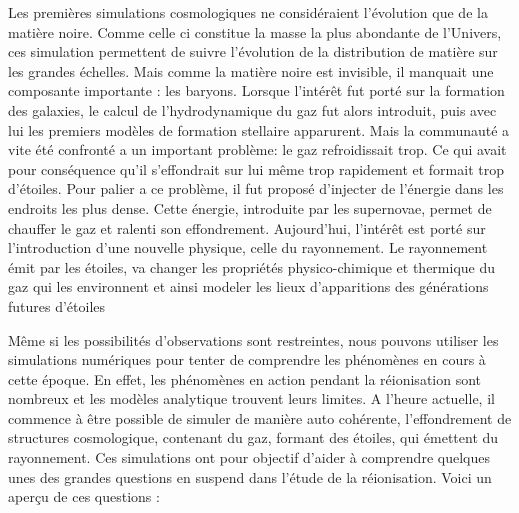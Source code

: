 Les premières simulations cosmologiques ne considéraient l'évolution que de la matière noire. %
Comme celle ci constitue la masse la plus abondante de l'Univers, ces simulation permettent de suivre l'évolution de la distribution de matière sur les grandes échelles. 
Mais comme la matière noire est invisible, il manquait une composante importante : les baryons.
Lorsque l'intérêt fut porté sur la formation des galaxies, le calcul de l'hydrodynamique du gaz fut alors introduit, puis avec lui les premiers modèles de formation stellaire apparurent.
Mais la communauté a vite été confronté a un important problème: le gaz refroidissait trop.
Ce qui avait pour conséquence qu'il s'effondrait sur lui même trop rapidement et formait trop d'étoiles.
Pour palier a ce problème, il fut proposé d'injecter de l'énergie dans les endroits les plus dense.
Cette énergie, introduite par les supernovae, permet de chauffer le gaz et ralenti son effondrement. 
Aujourd'hui, l'intérêt est porté sur l'introduction d'une nouvelle physique, celle du rayonnement.
Le rayonnement émit par les étoiles, va changer les propriétés physico-chimique et thermique du gaz qui les environnent et ainsi modeler les lieux d'apparitions des générations futures d'étoiles

Même si les possibilités d'observations sont restreintes, nous pouvons utiliser les simulations numériques pour tenter de comprendre les phénomènes en cours à cette époque.
En effet, les phénomènes en action pendant la réionisation sont nombreux et les modèles analytique trouvent leurs limites.
A l'heure actuelle, il commence à être possible de simuler de manière auto cohérente, l'effondrement de structures cosmologique, contenant du gaz, formant des étoiles, qui émettent du rayonnement.
Ces simulations ont pour objectif d'aider à comprendre quelques unes des grandes questions en suspend dans l'étude de la réionisation.
Voici un aperçu de ces questions : 

